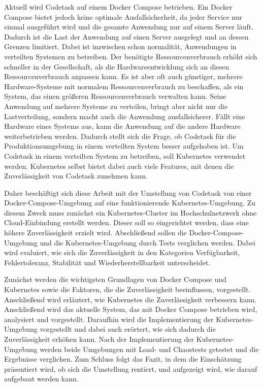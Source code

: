 Aktuell wird Codetask auf einem Docker Compose betrieben.
Ein Docker Compose bietet jedoch keine optimale Ausfallsicherheit, da jeder Service nur einmal ausgeführt wird und die gesamte Anwendung nur auf einem Server läuft.
Dadurch ist die Last der Anwendung auf einen Server ausgelegt und an dessen Grenzen limitiert.
Dabei ist inzwischen schon normalität, Anwendungen in verteilten Systemen zu betreiben. 
Der benötigte Ressourcenverbrauch erhöht sich schneller in der Gesellschaft, als die Hardwareentwicklung sich an diesen Ressourcenverbrauch anpassen kann.
Es ist aber oft auch günstiger, mehrere Hardware-Systeme mit normalem Ressourcenverbrauch zu beschaffen, als ein System, das einen größeren Ressourcenverbrauch verwalten kann.
Seine Anwendung auf mehrere Systeme zu verteilen, bringt aber nicht nur die Lastverteilung, sondern macht auch die Anwendung ausfallsicherer.
Fällt eine Hardware eines Systems aus, kann die Anwendung auf die andere Hardware weiterbetrieben werden.
Dadurch stellt sich die Frage, ob Codetask für die Produktionsumgebung in einem verteilten System besser aufgehoben ist.
Um Codetask in einem verteilten System zu betreiben, soll Kubernetes verwendet werden. Kubernetes selbst bietet dabei auch viele Features, mit denen die Zuverlässigkeit von Codetask zunehmen kann.

Daher beschäftigt sich diese Arbeit mit der Umstellung von Codetask von einer Docker-Compose-Umgebung auf eine funktionierende Kubernetes-Umgebung.
Zu diesem Zweck muss zunächst ein Kubernetes-Cluster im Hochschulnetzwerk ohne Cloud-Einbindung erstellt werden. Dieser soll so eingerichtet werden, dass eine höhere Zuverlässigkeit erzielt wird.
Abschließend sollen die Docker-Compose-Umgebung und die Kubernetes-Umgebung durch Tests verglichen werden. Dabei wird evaluiert, wie sich die Zuverlässigkeit in den Kategorien Verfügbarkeit, Fehlertoleranz, Stabilität und Wiederherstellbarkeit unterscheidet.

Zunächst werden die wichtigsten Grundlagen von Docker Compose und Kubernetes sowie die Faktoren, die die Zuverlässigkeit beeinflussen, vorgestellt. Anschließend wird erläutert, wie Kubernetes die Zuverlässigkeit verbessern kann.
Anschließend wird das aktuelle System, das mit Docker Compose betrieben wird, analysiert und vorgestellt.
Daraufhin wird die Implementierung der Kubernetes-Umgebung vorgestellt und dabei auch erörtert, wie sich dadurch die Zuverlässigkeit erhöhen kann.
Nach der Implementierung der Kubernetes-Umgebung werden beide Umgebungen mit Load- und Chaostests getestet und die Ergebnisse verglichen.
Zum Schluss folgt das Fazit, in dem die Einschätzung präsentiert wird, ob sich die Umstellung rentiert, und aufgezeigt wird, wie darauf aufgebaut werden kann.
